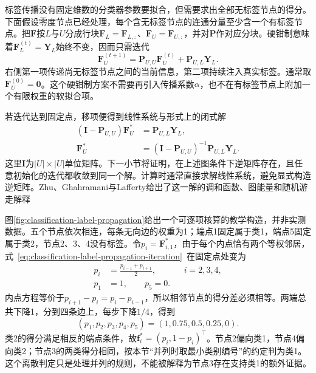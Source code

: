 标签传播没有固定维数的分类器参数要拟合，但需要求出全部无标签节点的得分。下面假设零度节点已经处理，每个含无标签节点的连通分量至少含一个有标签节点。把$\bm{F}$按$L$与$U$分成行块$\bm{F}_L=\bm{F}_{L,:}$、$\bm{F}_U=\bm{F}_{U,:}$，并对$\bm{P}$作对应分块。硬钳制意味着$\bm{F}_L^{(t)}=\bm{Y}_L$始终不变，因而只需迭代
\begin{equation}
  \label{eq:classification-label-propagation-iteration}
  \bm{F}_U^{(t+1)}
    =\bm{P}_{U,U}\bm{F}_U^{(t)}
     +\bm{P}_{U,L}\bm{Y}_L.
\end{equation}
右侧第一项传递尚无标签节点之间的当前信息，第二项持续注入真实标签。通常取$\bm{F}_U^{(0)}=\bm{0}$。这个硬钳制方案不需要再引入传播系数$\alpha$，也不在有标签节点上附加一个有限权重的软拟合项。

若迭代达到固定点，移项便得到线性系统与形式上的闭式解
\begin{equation}
  \label{eq:classification-label-propagation-solution}
  \begin{aligned}
    (\bm{I}-\bm{P}_{U,U})\bm{F}_U^\ast
      &=\bm{P}_{U,L}\bm{Y}_L,\\
    \bm{F}_U^\ast
      &=(\bm{I}-\bm{P}_{U,U})^{-1}
        \bm{P}_{U,L}\bm{Y}_L.
  \end{aligned}
\end{equation}
这里$\bm{I}$为$|U|\times|U|$单位矩阵。下一小节将证明，在上述图条件下逆矩阵存在，且任意初始化的迭代都收敛到同一个解。计算时通常直接求解线性系统，避免显式构造逆矩阵。Zhu、Ghahramani与Lafferty给出了这一解的调和函数、图能量和随机游走解释

图\ref{fig:classification-label-propagation}给出一个可逐项核算的教学构造，并非实测数据。五个节点依次相连，每条无向边的权重为1；端点1固定属于类1，端点5固定属于类2，节点2、3、4没有标签。令$p_i=\bm{F}_{i,1}^\ast$，由于每个内点恰有两个等权邻居，式~\eqref{eq:classification-label-propagation-iteration}~在固定点处变为
\begin{equation}
  \label{eq:classification-label-propagation-path}
  \begin{aligned}
    p_i&=\frac{p_{i-1}+p_{i+1}}{2},
      &&i=2,3,4,\\
    p_1&=1,\qquad p_5=0.
  \end{aligned}
\end{equation}
内点方程等价于$p_{i+1}-p_i=p_i-p_{i-1}$，所以相邻节点的得分差必须相等。两端总共下降1，分到四条边上，每步下降$1/4$，得到
\[
  (p_1,p_2,p_3,p_4,p_5)
    =(1,0.75,0.5,0.25,0).
\]
类2的得分满足相反的端点条件，故$\bm{f}_i^\ast=(p_i,1-p_i)^\top$。节点2偏向类1，节点4偏向类2；节点3的两类得分相同，按本节“并列时取最小类别编号”的约定判为类1。这个离散判定只是处理并列的规则，不能被解释为节点3存在支持类1的额外证据。

